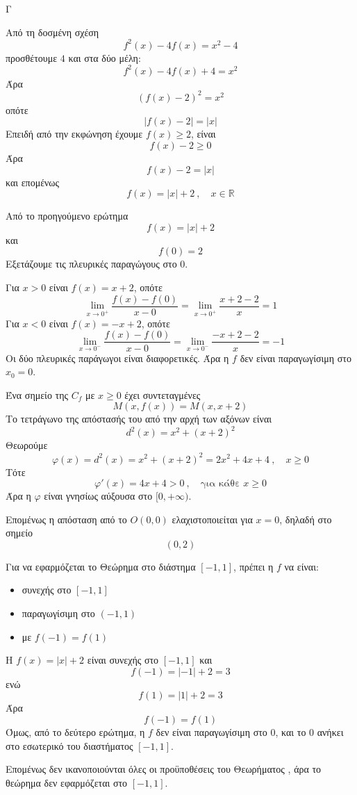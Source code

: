 \begin{thema}{Γ}
\begin{erwthma}
\item Από τη δοσμένη σχέση
\[
f^2(x)-4f(x)=x^2-4
\]
προσθέτουμε $4$ και στα δύο μέλη:
\[
f^2(x)-4f(x)+4=x^2
\]
Άρα
\[
\left(f(x)-2\right)^2=x^2
\]
οπότε
\[
|f(x)-2|=|x|
\]
Επειδή από την εκφώνηση έχουμε $f(x)\geq 2$, είναι
\[
f(x)-2\geq 0
\]
Άρα
\[
f(x)-2=|x|
\]
και επομένως
\[
f(x)=|x|+2\ ,\quad x\in\mathbb{R}
\]

\item Από το προηγούμενο ερώτημα
\[
f(x)=|x|+2
\]
και
\[
f(0)=2
\]
Εξετάζουμε τις πλευρικές παραγώγους στο $0$.

Για $x>0$ είναι $f(x)=x+2$, οπότε
\[
\lim\limits_{x\to 0^+}\frac{f(x)-f(0)}{x-0}
=\lim\limits_{x\to 0^+}\frac{x+2-2}{x}
=1
\]
Για $x<0$ είναι $f(x)=-x+2$, οπότε
\[
\lim\limits_{x\to 0^-}\frac{f(x)-f(0)}{x-0}
=\lim\limits_{x\to 0^-}\frac{-x+2-2}{x}
=-1
\]
Οι δύο πλευρικές παράγωγοι είναι διαφορετικές.
Άρα η $f$ δεν είναι παραγωγίσιμη στο $x_0=0$.

\item Ένα σημείο της $C_f$ με $x\geq 0$ έχει συντεταγμένες
\[
M(x,f(x))=M(x,x+2)
\]
Το τετράγωνο της απόστασής του από την αρχή των αξόνων είναι
\[
d^2(x)=x^2+(x+2)^2
\]
Θεωρούμε
\[
\varphi(x)=d^2(x)=x^2+(x+2)^2=2x^2+4x+4\ ,\quad x\geq 0
\]
Τότε
\[
\varphi'(x)=4x+4>0\ ,\quad \text{για κάθε }x\geq 0
\]
Άρα η $\varphi$ είναι γνησίως αύξουσα στο $[0,+\infty)$.

Επομένως η απόσταση από το $O(0,0)$ ελαχιστοποιείται για $x=0$, δηλαδή στο σημείο
\[
(0,2)
\]

\item Για να εφαρμόζεται το Θεώρημα  στο διάστημα $[-1,1]$, πρέπει η $f$ να είναι:
\begin{itemize}
\item συνεχής στο $[-1,1]$
\item παραγωγίσιμη στο $(-1,1)$
\item με $f(-1)=f(1)$
\end{itemize}
Η $f(x)=|x|+2$ είναι συνεχής στο $[-1,1]$ και
\[
f(-1)=|-1|+2=3
\]
ενώ
\[
f(1)=|1|+2=3
\]
Άρα
\[
f(-1)=f(1)
\]
Όμως, από το δεύτερο ερώτημα, η $f$ δεν είναι παραγωγίσιμη στο $0$, και το $0$ ανήκει στο εσωτερικό του διαστήματος $[-1,1]$.

Επομένως δεν ικανοποιούνται όλες οι προϋποθέσεις του Θεωρήματος , άρα το θεώρημα δεν εφαρμόζεται στο $[-1,1]$.
\end{erwthma}
\end{thema}

